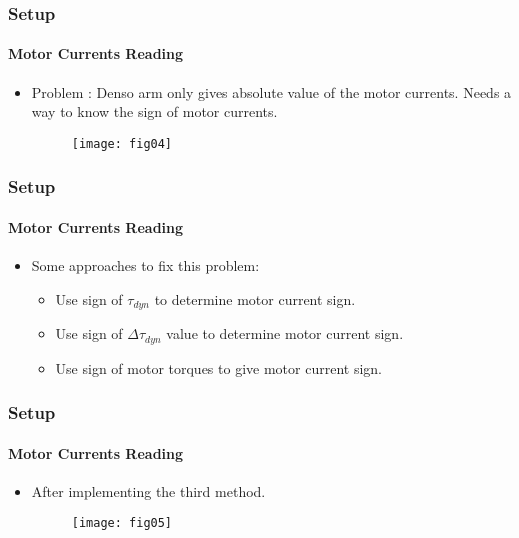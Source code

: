 \documentclass[12pt,english]{beamer}
\begin{document}
  \begin{frame}
    \frametitle{Setup}
    \framesubtitle{Motor Currents Reading}
    \begin{itemize}
      \item Problem : Denso arm only gives absolute value of the motor currents. Needs a way to know the sign of motor currents.
      \begin{figure}
        \texttt{[image: fig04]}
      \end{figure}
    \end{itemize}
  \end{frame}  
  
  \begin{frame}
    \frametitle{Setup}
    \framesubtitle{Motor Currents Reading}
    \begin{itemize}
      \item Some approaches to fix this problem:
      \begin{itemize}
        \item Use sign of $\tau_{dyn}$ to determine motor current sign.
        \item Use sign of $\Delta \tau_{dyn}$ value to determine motor current sign.
        \item Use sign of motor torques to give motor current sign.
      \end{itemize}
    \end{itemize}
  \end{frame}  
  
  \begin{frame}
    \frametitle{Setup}
    \framesubtitle{Motor Currents Reading}
    \begin{itemize}
      \item After implementing the third method.
      \begin{figure}
        \texttt{[image: fig05]}
      \end{figure}
    \end{itemize}
  \end{frame}  

\end{document}
